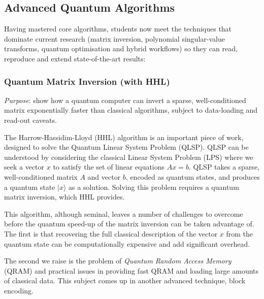 \subsection{Advanced Quantum Algorithms}

Having mastered core algorithms, students now meet the techniques that dominate current research
(matrix inversion, polynomial singular-value transforms, quantum optimisation and hybrid workflows)
so they can read, reproduce and extend state-of-the-art results:

\subsubsection*{Quantum Matrix Inversion (with HHL)}

\emph{Purpose}: show how a quantum computer can invert a sparse, well-conditioned matrix
exponentially faster than classical algorithms, subject to data-loading and read-out caveats.

The Harrow-Hassidim-Lloyd (HHL) \cite{Harrow:2009} \cite{Lipton:2021} algorithm is an important piece of work, 
designed to solve the Quantum Linear System Problem (QLSP). 
QLSP can be understood by considering the classical Linear System Problem (LPS) where we seek a vector $x$
to satisfy the set of linear equations $Ax = b$.  QLSP takes  a sparse, well-conditioned matrix  $A$ 
and vector $b$, encoded as quantum states, and produces a quantum state $\lvert x\rangle$ as a solution.  
Solving this problem requires a quantum matrix inversion, which HHL provides.

This algorithm, although seminal, leaves a number of challenges to overcome before the quantum speed-up of the 
matrix inversion can be taken advantage of.  The first is that recovering the full classical description of the 
vector $x$ from the quantum state can be computationally expensive and add significant overhead.

The second we raise is the problem of \emph{Quantum Random Access Memory} (QRAM) 
and practical issues in providing fast QRAM and loading large amounts of classical data.  
This subject comes up in another advanced technique, block encoding.

